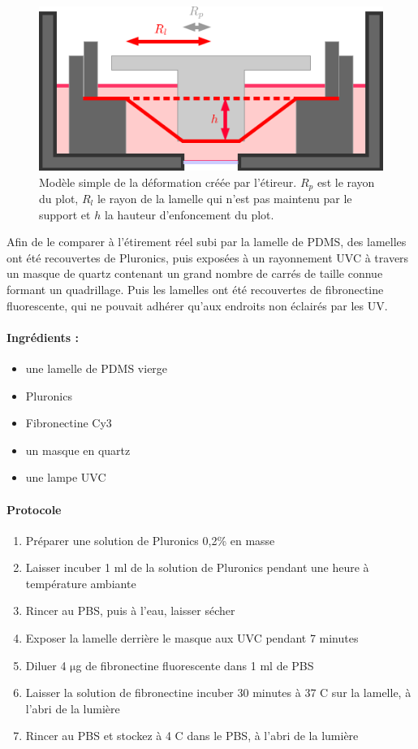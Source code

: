 \documentclass{report}
\newcommand{\micro}{$\mathrm{\mu}$}
\begin{document}
	\begin{figure}[h!]
		\includegraphics[scale=0.5]{Modele_etireur.png}
		\caption{Modèle simple de la déformation créée par l'étireur. $R_p$ est le rayon du plot, $R_l$ le rayon de la lamelle qui n'est pas maintenu par le support et $h$ la hauteur d'enfoncement du plot.}
		\end{figure}	
	Afin de le comparer à l'étirement réel subi par la lamelle de PDMS, des lamelles ont été recouvertes de Pluronics, puis exposées à un rayonnement UVC à travers un masque de quartz contenant un grand nombre de carrés de taille connue formant un quadrillage. Puis les lamelles ont été recouvertes de fibronectine fluorescente, qui ne pouvait adhérer qu'aux endroits non éclairés par les UV. 
	
	\paragraph{Ingrédients : }
	\begin{itemize}
	\item une lamelle de PDMS vierge
	\item Pluronics
	\item Fibronectine Cy3
	\item un masque en quartz 
	\item une lampe UVC
	\end{itemize}
	
	\paragraph{Protocole}
	\begin{enumerate}
	\item Préparer une solution de Pluronics 0,2\% en masse
	\item Laisser incuber 1 ml de la solution de Pluronics pendant une heure à température ambiante
	\item Rincer au PBS, puis à l'eau, laisser sécher
	\item Exposer la lamelle derrière le masque aux UVC pendant 7 minutes
	\item Diluer 4 \micro g de fibronectine fluorescente dans 1 ml de PBS
	\item Laisser la solution de fibronectine incuber 30 minutes à 37 \degres C sur la lamelle, à l'abri de la lumière
	\item Rincer au PBS et stockez à 4 \degres C dans le PBS, à l'abri de la lumière
\end{enumerate}		
	
\end{document}
